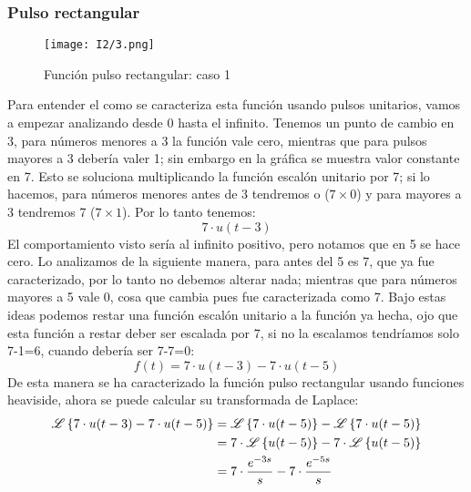 \documentclass[12pt,fleqn,a4paper,oneside]{LegrandOrangeBook}
\begin{document}
\subsubsection{Pulso rectangular}
\begin{wrapfigure}{l}{0.5\linewidth}
  \begin{center}
    \texttt{[image: I2/3.png]}
  \end{center}
  \caption{Función pulso rectangular: caso 1}
\end{wrapfigure}
Para entender el como se caracteriza esta función usando pulsos unitarios, vamos a empezar analizando desde 0 hasta el infinito. Tenemos un punto de cambio en 3, para números menores a 3 la función vale cero, mientras que para pulsos mayores a 3 debería valer 1; sin embargo en la gráfica se muestra valor constante en 7. Esto se soluciona multiplicando la función escalón unitario por 7; si lo hacemos, para números menores antes de 3 tendremos o ($7\times 0$) y para mayores a 3 tendremos 7 ($7\times 1$). Por lo tanto tenemos:
\begin{displaymath}
7\cdot u(t-3)
\end{displaymath}
El comportamiento visto sería al infinito positivo, pero notamos que en 5 se hace cero. Lo analizamos de la siguiente manera, para antes del 5 es 7, que ya fue caracterizado, por lo tanto no debemos alterar nada; mientras que para números mayores a 5 vale 0, cosa que cambia pues fue caracterizada como 7. Bajo estas ideas podemos restar una función escalón unitario a la función ya hecha, ojo que esta función a restar deber ser escalada por 7, si no la escalamos tendríamos solo 7-1=6, cuando debería ser 7-7=0:
\begin{displaymath}
f(t)=7\cdot u(t-3)-7\cdot u(t-5)
\end{displaymath}
De esta manera se ha caracterizado la función pulso rectangular usando funciones heaviside, ahora se puede calcular su transformada de Laplace:
\begin{align*}
\mathscr{L}\left\lbrace 7\cdot u(t-3)-7\cdot u(t-5)\right\rbrace&=\mathscr{L}\left\lbrace 7\cdot u(t-5)\right\rbrace-\mathscr{L}\left\lbrace 7\cdot u(t-5)\right\rbrace\\
&=7\cdot\mathscr{L}\left\lbrace u(t-5)\right\rbrace-7\cdot\mathscr{L}\left\lbrace u(t-5)\right\rbrace\\
&=7\cdot\frac{e^{-3s}}{s}-7\cdot\frac{e^{-5s}}{s}
\end{align*}
\end{document}
